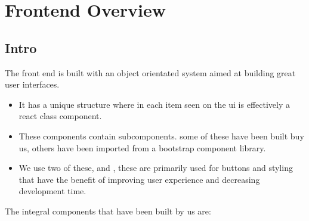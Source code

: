 \documentclass[letterpaper,10pt,english]{sphinxmanual}
\let\oldsubsection\subsection
\renewcommand{\subsection}{\needspace{6\baselineskip}\oldsubsection}
\begin{document}
\section{Frontend Overview}
\label{\detokenize{docs/System_Overview/Frontend_overview:frontend-overview}}\label{\detokenize{docs/System_Overview/Frontend_overview::doc}}

\subsection{Intro}
\label{\detokenize{docs/System_Overview/Frontend_overview:intro}}
The front end is built with  an object
orientated system aimed at building great user interfaces.
\begin{itemize}
\item {} 
It has a unique structure where in each item seen on the ui is effectively a
react class component.

\item {} 
These components contain subcomponents. some of these have been built buy us, others have been imported from a boot\sphinxhyphen{}strap component library.

\item {} 
We use two of these,  and ,
these are primarily used for buttons and styling that have the benefit of improving user
experience and decreasing development time.

\end{itemize}

The integral components that have been built by us are:
\end{document}
